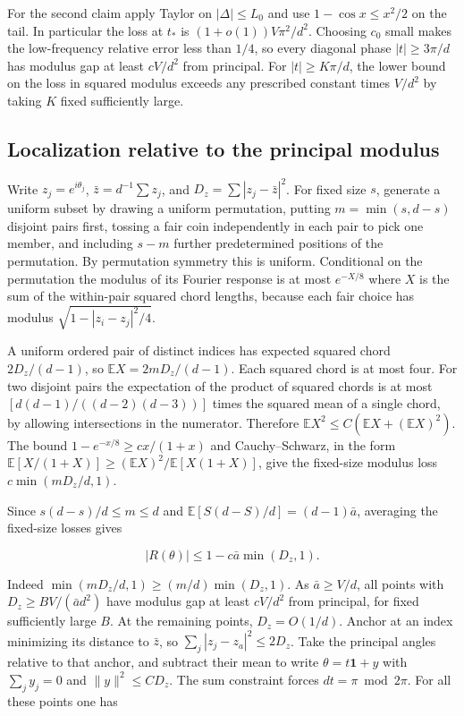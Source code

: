 For the second claim apply Taylor on $|\Delta|\le L_0$ and use $1-\cos x\le x^2/2$ on the tail. In particular the loss at $t_*$ is $(1+o(1))V\pi^2/d^2$. Choosing $c_0$ small makes the low-frequency relative error less than $1/4$, so every diagonal phase $|t|\ge 3\pi/d$ has modulus gap at least $cV/d^2$ from principal. For $|t|\ge K\pi/d$, the lower bound on the loss in squared modulus exceeds any prescribed constant times $V/d^2$ by taking $K$ fixed sufficiently large.

\subsection{Localization relative to the principal modulus}

Write $z_j=e^{i\theta_j}$, $\bar z=d^{-1}\sum z_j$, and $D_z=\sum|z_j-\bar z|^2$. For fixed size $s$, generate a uniform subset by drawing a uniform permutation, putting $m=\min(s,d-s)$ disjoint pairs first, tossing a fair coin independently in each pair to pick one member, and including $s-m$ further predetermined positions of the permutation. By permutation symmetry this is uniform. Conditional on the permutation the modulus of its Fourier response is at most $e^{-X/8}$ where $X$ is the sum of the within-pair squared chord lengths, because each fair choice has modulus $\sqrt{1-|z_i-z_j|^2/4}$.

A uniform ordered pair of distinct indices has expected squared chord $2D_z/(d-1)$, so $\mathbb EX=2mD_z/(d-1)$. Each squared chord is at most four. For two disjoint pairs the expectation of the product of squared chords is at most $[d(d-1)/( (d-2)(d-3))]$ times the squared mean of a single chord, by allowing intersections in the numerator. Therefore $\mathbb E X^2\le C(\mathbb EX+(\mathbb EX)^2)$. The bound $1-e^{-x/8}\ge c x/(1+x)$ and Cauchy--Schwarz, in the form $\mathbb E[X/(1+X)]\ge(\mathbb EX)^2/\mathbb E[X(1+X)]$, give the fixed-size modulus loss $c\min(mD_z/d,1)$.

Since $s(d-s)/d\le m\le d$ and $\mathbb E[S(d-S)/d]=(d-1)\bar a$, averaging the fixed-size losses gives

\begin{equation*}
|R(\theta)|\le 1-c\bar a\min(D_z,1).
\end{equation*}

Indeed $\min(mD_z/d,1)\ge (m/d)\min(D_z,1)$. As $\bar a\ge V/d$, all points with $D_z\ge B V/(\bar a d^2)$ have modulus gap at least $cV/d^2$ from principal, for fixed sufficiently large $B$. At the remaining points, $D_z=O(1/d)$. Anchor at an index minimizing its distance to $\bar z$, so $\sum_j|z_j-z_a|^2\le2D_z$. Take the principal angles relative to that anchor, and subtract their mean to write $\theta=t\mathbf1+y$ with $\sum_jy_j=0$ and $\|y\|^2\le C D_z$. The sum constraint forces $dt=\pi\bmod 2\pi$. For all these points one has

